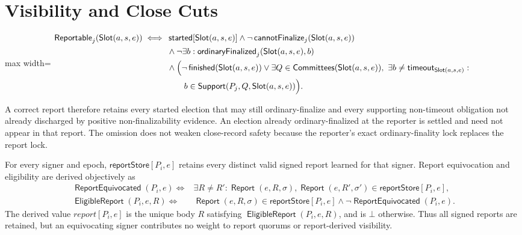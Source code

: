 \documentclass[sigplan,twocolumn,review,anonymous]{acmart}
\newcommand{\func}[1]{\operatorname{\mathsf{#1}}}
\newcommand{\Report}{\func{Report}}
\newcommand{\Slot}{\func{Slot}}
\newcommand{\started}{\func{started}}
\newcommand{\finished}{\func{finished}}
\newcommand{\timeoutVal}{\mathsf{timeout}}
\newcommand{\Committees}{\func{Committees}}
\newcommand{\Reportable}{\func{Reportable}}
\newcommand{\ordinaryFinalized}{\func{ordinaryFinalized}}
\newcommand{\cannotFinalize}{\func{cannotFinalize}}
\newcommand{\reportStore}{\mathsf{reportStore}}
\newcommand{\ReportEquivocated}{\func{ReportEquivocated}}
\newcommand{\EligibleReport}{\func{EligibleReport}}
\begin{document}
\section{Visibility and Close Cuts}

\begin{center}
\begin{adjustbox}{max width=\columnwidth}
\(\displaystyle
\begin{aligned}
\Reportable_j(\Slot(a,s,e))\iff{}& \started[\Slot(a,s,e)]\wedge
\neg\cannotFinalize_j(\Slot(a,s,e))\\
&\wedge\neg\exists b:\ordinaryFinalized_j(\Slot(a,s,e),b)\\
&\wedge\Bigl(\neg\finished(\Slot(a,s,e))\vee
\exists Q\in\Committees(\Slot(a,s,e)),\ \exists b\neq\timeoutVal_{\Slot(a,s,e)}:\\
&\qquad b\in\func{Support}(P_j,Q,\Slot(a,s,e))\Bigr).
\end{aligned}
\)
\end{adjustbox}
\end{center}
A correct report therefore retains every started election that may still ordinary-finalize and every
supporting non-timeout obligation not already discharged by positive non-finalizability evidence.  An
election already ordinary-finalized at the reporter is settled and need not appear in that report.  The
omission does not weaken close-record safety because the reporter's exact ordinary-finality lock replaces
the report lock.

For every signer and epoch, \(\reportStore[P_i,e]\) retains every distinct valid signed report learned
for that signer.  Report equivocation and eligibility are derived objectively as
\[
\begin{aligned}
\ReportEquivocated(P_i,e)\iff{}&\exists R\neq R':
\Report(e,R,\sigma),\Report(e,R',\sigma')\in\reportStore[P_i,e],\\
\EligibleReport(P_i,e,R)\iff{}&\Report(e,R,\sigma)\in\reportStore[P_i,e]
\wedge\neg\ReportEquivocated(P_i,e).
\end{aligned}
\]
The derived value \(report[P_i,e]\) is the unique body \(R\) satisfying
\(\EligibleReport(P_i,e,R)\), and is \(\bot\) otherwise.  Thus all signed reports are retained,
but an equivocating signer contributes no weight to report quorums or report-derived visibility.
\end{document}
